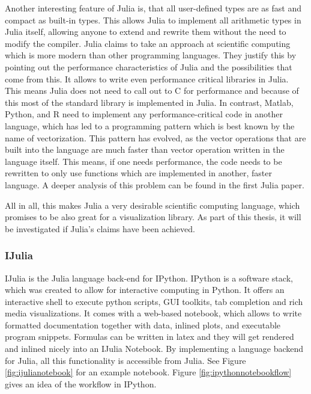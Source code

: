 Another interesting feature of Julia is, that all user-defined types are as fast and compact as built-in types.
This allows Julia to implement all arithmetic types in Julia itself, allowing anyone to extend and rewrite them without the need to modify the compiler.
Julia claims to take an approach at scientific computing which is more modern than other programming languages.
They justify this by pointing out the performance characteristics of Julia and the possibilities that come from this\cite{2013arXiv1312.1431L}\cite{DBLP:journals/corr/abs-1209-5145}. 
It allows to write even performance critical libraries in Julia. 
This means Julia does not need to call out to C for performance and because of this most of the standard library is implemented in Julia.
In contrast, Matlab, Python, and R need to implement any performance-critical code in another language, which has led to a programming pattern which is best known by the name of vectorization\cite{DBLP:journals/corr/abs-1209-5145}. This pattern has evolved, as the vector operations that are built into the language are much faster than vector operation written in the language itself.
This means, if one needs performance, the code needs to be rewritten to only use functions which are implemented in another, faster language.
A deeper analysis of this problem can be found in the first Julia paper\cite{DBLP:journals/corr/abs-1209-5145}.

All in all, this makes Julia a very desirable scientific computing language, which promises to be also great for a visualization library.
As part of this thesis, it will be investigated if Julia's claims\cite{WhyJulia} have been achieved.



\subsubsection{IJulia}
IJulia\cite{IJulia} is the Julia language back-end for IPython.
IPython is a software stack, which was created to allow for interactive computing in Python.
It offers an interactive shell to execute python scripts, \ac{GUI} toolkits, tab completion and rich media visualizations.
It comes with a web-based notebook, which allows to write formatted documentation together with data, inlined plots, and executable program snippets. 
Formulas can be written in latex and they will get rendered and inlined nicely into an IJulia Notebook. By implementing a language backend for Julia, all this functionality is accessible from Julia.
See Figure \ref{fig:ijulianotebook} for an example notebook. Figure \ref{fig:ipythonnotebookflow} gives an idea of the workflow in IPython.

